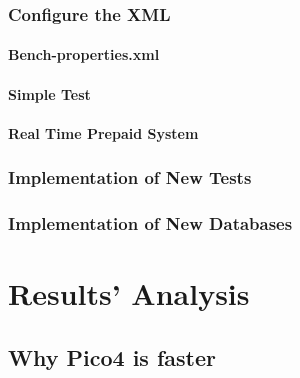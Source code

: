		\subsection{Configure the XML}
			\subsubsection{Bench-properties.xml}
			\subsubsection{Simple Test}
			\subsubsection{Real Time Prepaid System}
			
		\subsection{Implementation of New Tests}%
		\subsection{Implementation of New Databases}%


\chapter{Results' Analysis}
	\section{Why Pico4 is faster}
